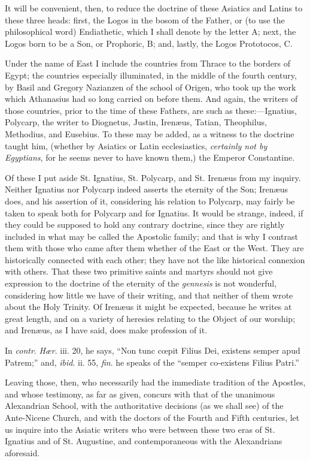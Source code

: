 It will be convenient, then, to reduce the doctrine of these
Asiatics and Latins to these three heads: first, the Logos in the
bosom of the Father, or (to use the philosophical word) Endiathetic,
which I shall denote by the letter A; next, the Logos born to be a
Son, or Prophoric, B; and, lastly, the Logos Prototocos, C.

Under the name of East I include the countries from Thrace to the
borders of Egypt; the countries especially illuminated, in the middle
of the fourth century, by Basil and Gregory Nazianzen of the school of
Origen, who took up the work which Athanasius had so long carried on
before them. And again, the writers of those countries, prior to the
time of these Fathers, are such as these:—Ignatius, Polycarp, the
writer to Diognetus, Justin, Irenæus, Tatian, Theophilus, Methodius,
and Eusebius. To these may be added, as a witness to the doctrine
taught him, (whether by Asiatics or Latin ecclesiastics, \emph{certainly
not by Egyptians}, for he seems never to have known them,) the
Emperor Constantine.

Of these I put aside St. Ignatius, St. Polycarp, and St. Irenæus
from my inquiry. Neither Ignatius nor Polycarp indeed asserts the
eternity of the Son; Irenæus does, and his assertion of it,
considering his relation to Polycarp, may fairly be taken to speak
both for Polycarp and for Ignatius. It would be strange, indeed, if
they could be supposed to hold any contrary doctrine, since they are
rightly included in what may be called the Apostolic family; and that
is why I contrast them with those who came after them whether of the
East or the West. They are historically connected with each other;
they have not the like historical connexion with others. That these
two primitive saints and martyrs should not give expression to the
doctrine of the eternity of the \emph{gennesis} is not wonderful,
considering how little we have of their writing, and that neither of
them wrote about the Holy Trinity. Of Irenæus it might be expected,
because he writes at great length, and on a variety of heresies
relating to the Object of our worship; and Irenæus, as I have said,
does make profession of it.

In \emph{contr}. \emph{Hær}. iii. 20, he says, ``Non tunc cœpit
Filius Dei, existens semper apud Patrem;'' and, \emph{ibid}. ii.
55, \emph{fin}. he speaks of the ``semper co-existens Filius Patri.''

Leaving those, then, who necessarily had the immediate tradition of
the Apostles, and whose testimony, as far as given, concurs with that
of the unanimous Alexandrian School, with the authoritative
decisions (as we shall see) of the Ante-Nicene Church, and with the
doctors of the Fourth and Fifth centuries, let us inquire into the
Asiatic writers who were between these two eras of St. Ignatius and of
St. Augustine, and contemporaneous with the Alexandrians aforesaid.

